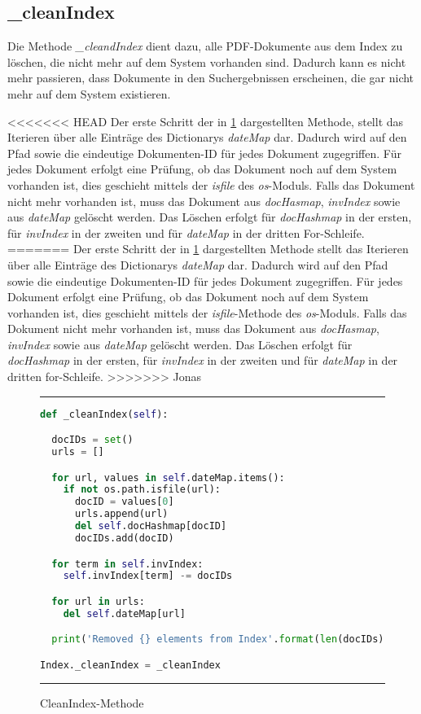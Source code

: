 \subsection{\_cleanIndex}\label{cleanIndex}
Die Methode \textit{\_cleandIndex} dient dazu, alle PDF-Dokumente aus dem Index zu löschen, die nicht mehr auf dem System vorhanden sind. Dadurch kann es nicht mehr passieren, dass Dokumente in den Suchergebnissen erscheinen, die gar nicht mehr auf dem System existieren.

<<<<<<< HEAD
Der erste Schritt der in \ref{fig:cleanIndex} dargestellten Methode, stellt das Iterieren über alle Einträge des Dictionarys \textit{dateMap} dar. Dadurch wird auf den Pfad sowie die eindeutige Dokumenten-ID für jedes Dokument zugegriffen.
Für jedes Dokument erfolgt eine Prüfung, ob das Dokument noch auf dem System vorhanden ist, dies geschieht mittels der \textit{isfile} des \textit{os}-Moduls. Falls das Dokument nicht mehr vorhanden ist, muss das Dokument aus \textit{docHasmap}, \textit{invIndex} sowie aus \textit{dateMap} gelöscht werden. 
Das Löschen erfolgt für \textit{docHashmap} in der ersten, für \textit{invIndex} in der zweiten und für \textit{dateMap} in der dritten For-Schleife.
=======
Der erste Schritt der in \ref{fig:cleanIndex} dargestellten Methode stellt das Iterieren über alle Einträge des Dictionarys \textit{dateMap} dar. Dadurch wird auf den Pfad sowie die eindeutige Dokumenten-ID für jedes Dokument zugegriffen.
Für jedes Dokument erfolgt eine Prüfung, ob das Dokument noch auf dem System vorhanden ist, dies geschieht mittels der \textit{isfile}-Methode des \textit{os}-Moduls. Falls das Dokument nicht mehr vorhanden ist, muss das Dokument aus \textit{docHasmap}, \textit{invIndex} sowie aus \textit{dateMap} gelöscht werden. 
Das Löschen erfolgt für \textit{docHashmap} in der ersten, für \textit{invIndex} in der zweiten und für \textit{dateMap} in der dritten for-Schleife.
>>>>>>> Jonas

\begin{figure}
	\rule{\textwidth}{0.4pt}
	\begin{lstlisting}[language=Python]
def _cleanIndex(self):

  docIDs = set()
  urls = []

  for url, values in self.dateMap.items():
    if not os.path.isfile(url):
      docID = values[0]
      urls.append(url)
      del self.docHashmap[docID]
      docIDs.add(docID)

  for term in self.invIndex:
    self.invIndex[term] -= docIDs

  for url in urls:
    del self.dateMap[url]

  print('Removed {} elements from Index'.format(len(docIDs)))

Index._cleanIndex = _cleanIndex

	\end{lstlisting}
	\rule{\textwidth}{0.4pt}
	\caption{CleanIndex-Methode}
	\label{fig:cleanIndex}
\end{figure}

